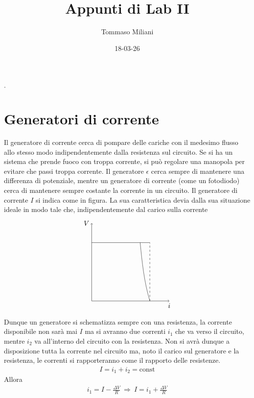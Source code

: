 \documentclass[a4paper, oneside]{article}
\title{Appunti di Lab II}
\author{Tommaso Miliani}
\date{18-03-26}
\begin{document}
                {}          %
                {}          %
                {\slshape}  %
                {}          %
                {\bfseries} %
                {.}         %
                {\newline}  %
                {}          %
\theoremstyle{theoremEnv}

\newtheorem{definition}{Definizione}[section]
\newtheorem{theorem}{Teorema}[section]
\newtheorem{lemma}{Proposizione}[section]
\newtheorem{observation}{Osservazione}[section]
\newtheorem{corollary}{Corollario}[theorem]
\newtheorem{example}{Esempio}[section]
\newtheorem{remark}{Enunciato}[section]

\maketitle

\section{Generatori di corrente}
Il generatore di corrente cerca di pompare delle cariche con il medesimo 
flusso allo stesso modo indipendentemente dalla resistenza sul circuito. 
Se si ha un sistema che prende fuoco con troppa corrente, si può regolare una 
manopola per evitare che passi troppa corrente. Il generatore $\epsilon$ cerca sempre di mantenere una 
differenza di potenziale, mentre un generatore di corrente (come un fotodiodo) cerca di 
mantenere sempre costante la corrente in un circuito. Il generatore di corrente $I$
si indica come in figura. La sua caratteristica devia dalla sua situazione ideale in modo tale 
che, indipendentemente dal carico sulla corrente 
\begin{gather*}
    \begin{tikzpicture}
        \draw[->](0, 0) -- (4, 0) node[at end, below] {$i$};
        \draw[->](0, 0) -- (0, 4) node[at end, left] {$V$};
        \draw(0, 3) -- (3, 3);
        \draw[dashed](3, 0) -- (3, 3);
        \draw(3, 0) .. controls (2.7, 1) and (2.6, 2) .. (2.5, 3);
    \end{tikzpicture}
\end{gather*}
Dunque un generatore si schematizza sempre con una resistenza, la corrente disponibile 
non sarà mai $I$ ma si avranno due correnti $i_1$ che va verso il circuito, mentre $i_2$ 
va all'interno del circuito con la resistenza. Non si avrà dunque a disposizione tutta la corrente 
nel circuito ma, noto il carico sul generatore e la resistenza, le correnti si rapporteranno 
come il rapporto delle resistenze.
\begin{gather*}
    I = i_1 + i_2 = \text{const}
\end{gather*}
Allora
\begin{gather*}
    i_1 = I - \frac{\Delta V}{R} \ \Longrightarrow \ I = i_1 + \frac{\Delta V}{R}
\end{gather*}
\end{document}
